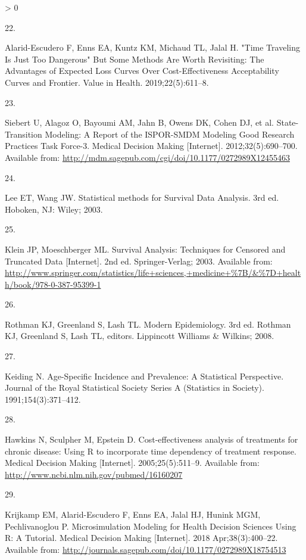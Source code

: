 \documentclass[
]{article}
\newlength{\cslhangindent}
\newlength{\csllabelwidth}
\newenvironment{CSLReferences}[2] %
 {%
  \setlength{\parindent}{0pt}
  \ifodd #1 \everypar{\setlength{\hangindent}{\cslhangindent}}\ignorespaces\fi
  \ifnum #2 > 0
  \setlength{\parskip}{#2\baselineskip}
  \fi
 }%
 {}
\newcommand{\CSLLeftMargin}[1]{\parbox[t]{\csllabelwidth}{#1}}
\newcommand{\CSLRightInline}[1]{\parbox[t]{\linewidth - \csllabelwidth}{#1}\break}
\begin{document}
\begin{CSLReferences}{0}{0}
\leavevmode\hypertarget{ref-Alarid-Escudero2019}{}%
\CSLLeftMargin{22. }
\CSLRightInline{Alarid-Escudero F, Enns EA, Kuntz KM, Michaud TL, Jalal H. {"Time Traveling Is Just Too Dangerous" But Some Methods Are Worth Revisiting: The Advantages of Expected Loss Curves Over Cost-Effectiveness Acceptability Curves and Frontier}. Value in Health. 2019;22(5):611--8. }

\leavevmode\hypertarget{ref-Siebert2012c}{}%
\CSLLeftMargin{23. }
\CSLRightInline{Siebert U, Alagoz O, Bayoumi AM, Jahn B, Owens DK, Cohen DJ, et al. {State-Transition Modeling: A Report of the ISPOR-SMDM Modeling Good Research Practices Task Force-3}. Medical Decision Making {[}Internet{]}. 2012;32(5):690--700. Available from: \url{http://mdm.sagepub.com/cgi/doi/10.1177/0272989X12455463}}

\leavevmode\hypertarget{ref-Lee2003a}{}%
\CSLLeftMargin{24. }
\CSLRightInline{Lee ET, Wang JW. {Statistical methods for Survival Data Analysis}. 3rd ed. Hoboken, NJ: Wiley; 2003. }

\leavevmode\hypertarget{ref-Klein2003}{}%
\CSLLeftMargin{25. }
\CSLRightInline{Klein JP, Moeschberger ML. {Survival Analysis: Techniques for Censored and Truncated Data} {[}Internet{]}. 2nd ed. Springer-Verlag; 2003. Available from: \url{http://www.springer.com/statistics/life+sciences,+medicine+\%7B/\&\%7D+health/book/978-0-387-95399-1}}

\leavevmode\hypertarget{ref-Rothman2008h}{}%
\CSLLeftMargin{26. }
\CSLRightInline{Rothman KJ, Greenland S, Lash TL. {Modern Epidemiology}. 3rd ed. Rothman KJ, Greenland S, Lash TL, editors. Lippincott Williams {\&} Wilkins; 2008. }

\leavevmode\hypertarget{ref-Keiding1991}{}%
\CSLLeftMargin{27. }
\CSLRightInline{Keiding N. {Age-Specific Incidence and Prevalence: A Statistical Perspective}. Journal of the Royal Statistical Society Series A (Statistics in Society). 1991;154(3):371--412. }

\leavevmode\hypertarget{ref-Hawkins2005}{}%
\CSLLeftMargin{28. }
\CSLRightInline{Hawkins N, Sculpher M, Epstein D. {Cost-effectiveness analysis of treatments for chronic disease: Using R to incorporate time dependency of treatment response.} Medical Decision Making {[}Internet{]}. 2005;25(5):511--9. Available from: \url{http://www.ncbi.nlm.nih.gov/pubmed/16160207}}

\leavevmode\hypertarget{ref-Krijkamp2018}{}%
\CSLLeftMargin{29. }
\CSLRightInline{Krijkamp EM, Alarid-Escudero F, Enns EA, Jalal HJ, Hunink MGM, Pechlivanoglou P. {Microsimulation Modeling for Health Decision Sciences Using R: A Tutorial}. Medical Decision Making {[}Internet{]}. 2018 Apr;38(3):400--22. Available from: \url{http://journals.sagepub.com/doi/10.1177/0272989X18754513}}


\end{CSLReferences}
\end{document}
